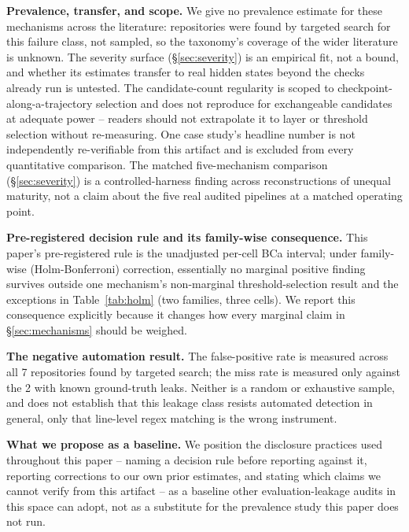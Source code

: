 \documentclass{article}
\begin{document}
\textbf{Prevalence, transfer, and scope.} We give no prevalence estimate for
these mechanisms across the literature: repositories were found by targeted
search for this failure class, not sampled, so the taxonomy's coverage of the
wider literature is unknown. The severity surface (\S\ref{sec:severity}) is an
empirical fit, not a bound, and whether its estimates transfer to real hidden
states beyond the checks already run is untested. The candidate-count
regularity is scoped to checkpoint-along-a-trajectory selection and does not
reproduce for exchangeable candidates at adequate power -- readers should not
extrapolate it to layer or threshold selection without re-measuring. One case
study's headline number is not independently re-verifiable from this artifact
and is excluded from every quantitative comparison. The matched five-mechanism
comparison (\S\ref{sec:severity}) is a controlled-harness finding across
reconstructions of unequal maturity, not a claim about the five real audited
pipelines at a matched operating point.

\textbf{Pre-registered decision rule and its family-wise consequence.} This
paper's pre-registered rule is the unadjusted per-cell BCa interval; under
family-wise (Holm-Bonferroni) correction, essentially no marginal positive
finding survives outside one mechanism's non-marginal threshold-selection
result and the exceptions in Table~\ref{tab:holm} (two families, three cells).
We report this consequence explicitly because it changes how every marginal
claim in \S\ref{sec:mechanisms} should be weighed.

\textbf{The negative automation result.} The false-positive rate is measured across all
7 repositories found by targeted search; the miss rate is measured only
against the 2 with known ground-truth leaks. Neither is a random or
exhaustive sample, and does not establish that this leakage class resists
automated detection in general, only that line-level regex matching is the
wrong instrument.

\textbf{What we propose as a baseline.} We position the disclosure practices
used throughout this paper -- naming a decision rule before reporting against
it, reporting corrections to our own prior estimates, and stating which claims
we cannot verify from this artifact -- as a baseline other evaluation-leakage
audits in this space can adopt, not as a substitute for the prevalence study
this paper does not run.
\end{document}
